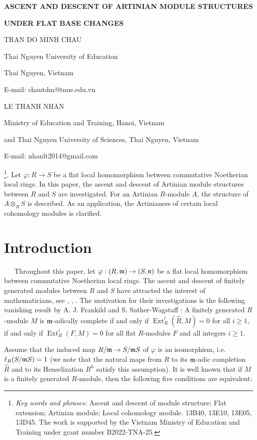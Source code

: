 \documentclass[a4papersize]{article}
\DeclareMathOperator{\Ext}{Ext}
\begin{document}
\large
\centerline{\Large {\bf ASCENT AND DESCENT OF ARTINIAN MODULE STRUCTURES}}
\smallskip

  \centerline{\Large {\bf  UNDER FLAT BASE CHANGES}}
\medskip

\vskip 0.7cm
\centerline { TRAN DO MINH CHAU}
\centerline {  Thai Nguyen University of Education}
\centerline{Thai Nguyen, Vietnam}
\centerline {E-mail: chautdm@tnue.edu.vn}
\vskip 0.4cm


\centerline {LE THANH NHAN}
\centerline { Ministry of Education and Training, Hanoi, Vietnam}
\centerline {and Thai Nguyen University of Sciences, Thai Nguyen, Vietnam}
\centerline {E-mail: nhanlt2014@gmail.com}

\vskip 0.4cm
\smallskip
\vskip 1cm

   {\footnote{ {\it{Key words and phrases: }} Ascent and descent of module structure; Flat extension; Artinian module; Local cohomology module. \hfill{} 13B40, 13E10, 13E05, 13D45. \hfill\break The work is supported by the Vietnam Ministry of Education and Training under grant number  B2022-TNA-25.}}.  Let $\varphi: R\rightarrow S$ be a flat local homomorphism between commutative Noetherian local rings. In this paper, the ascent and descent of Artinian module structures between $R$ and $S$ are investigated. For an Artinian $R$-module $A$, the structure of $A\otimes_RS$ is described. As an application, the Artinianess of certain local cohomology modules is clarified. 
 
\section{Introduction}  

\ \ \ Throughout this paper, let $\varphi: (R, \frak m)\rightarrow (S, \frak n)$ be a flat local homomorphism between commutative Noetherian local rings. The ascent and descent of finitely generated modules between $R$ and $S$ have attracted the interest of mathematicians, see \cite{AW}, \cite{FWW}, \cite{W}. The motivation for their investigations is the following vanishing result by A. J. Frankild and S. Sather-Wagstaff \cite{FW}: A finitely generated $R$-module $M$ is $\frak m$-adically complete if and only if $\Ext^i_R(\widehat R, M)=0$ for all $i\geq 1,$   if and only if $\Ext^i_R(F, M)=0$ for all flat $R$-modules $F$ and all integers $i\geq 1$. 

Assume that the induced map $R/\frak m\rightarrow S/\frak mS$ of $\varphi$ is an isomorphism, i.e. $\ell_R(S/\frak mS)=1$ (we note that the natural maps from $R$ to its $\frak m$-adic completion $\widehat R$ and to its Henselization $R^h$ satisfy this assumption). It is well known that if $M$ is a finitely generated $R$-module, then the  following five conditions are equivalent:
\end{document}

